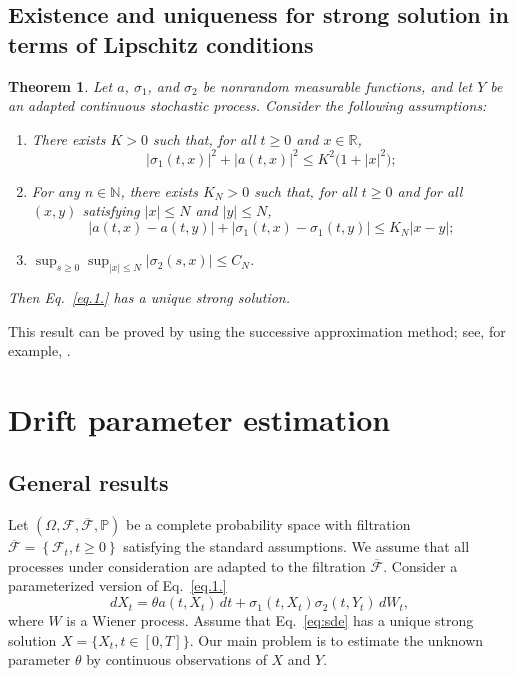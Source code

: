 \documentclass[numbers,compress,v1.0.1]{vmsta}
\newtheorem{thm}{Theorem}
\theoremstyle{remark}
\newcommand{\F}{\mathcal F}
\newcommand{\R}{\mathbb R}
\renewcommand{\P}{\mathbb P}
\newcommand*{\abs}[1]{\left\lvert#1\right\rvert}
\newcommand*{\set}[1]{\left\{#1\right\}}
\begin{document}
\subsection{Existence and uniqueness for strong solution in terms of
Lipschitz conditions}

\begin{thm}\label{th:Lip} Let $a$, $\sigma_1 $, and
$\sigma_2$ be nonrandom measurable functions, and let $Y$ be an
adapted continuous stochastic process.
Consider the following assumptions:
%
\begin{enumerate}[\rm(i)]
%
\item
There exists $K>0$ such that, for all $t\geq0$ and $x\in\R$,
%
\[
\big| \sigma_1(t,x)\big| ^2 +\big| a(t,x)\big| ^2
\leq K^2 \bigl(1+\abs{ x }^2\bigr);
\]
%
\item
For any $n\in{\mathbb N}$, there exists $K_N>0$ such that, for all
$t\geq0$ and for all $(x,y)$ satisfying $\abs{x} \leq N$ and $\abs{y}
\leq N$,
%
\[
\big| a(t,x)-a(t,y)\big| + \big| \sigma_1(t,x)-\sigma_1(t,y)\big|
\leq K_N \abs { x-y };
\]
%
\item
$\sup_{s \geq0} \sup_{\abs{x}\leq N} \abs{ \sigma_2(s,x) }\leq C_N$.
\end{enumerate}
%
Then Eq.~\eqref{eq.1.} has a unique strong solution.
\end{thm}
%
This result can be proved by using the successive approximation method;
see, for example, \cite[Thm.~1.2]{Nisio15}.

\section{Drift parameter estimation}
\label{sec:3}

\subsection{General results}
Let $(\varOmega, \F,\overline{\F}, \P)$ be a complete probability
space with filtration $\overline{\F}=\set{\F_t, t \ge0}$
satisfying the standard assumptions. We assume that all
processes under consideration are adapted to the filtration
$\overline{\F}$.
Consider a parameterized version of Eq.~\eqref{eq.1.}
%
\begin{equation}
\label{eq:sde} dX_t =\theta a(t,X_t)\,dt +
\sigma_1(t,X_t) \sigma_2(t,Y_t)
\,dW_t,
\end{equation}
%
where $W$ is a Wiener process.
Assume that Eq.~\eqref{eq:sde} has a unique strong
solution $X=\{X_t,t\in[0,T]\}$. Our main problem is to estimate
the unknown parameter $\theta$ by continuous observations of $X$ and $Y$.
\end{document}
